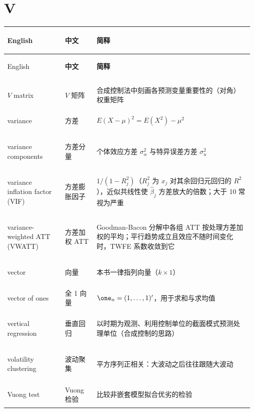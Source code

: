 \section*{V}
\begin{longtable}{@{}>{\bfseries\boldmath\raggedright\arraybackslash}p{4.6cm}>{\raggedright\arraybackslash}p{3.2cm}>{\raggedright\arraybackslash}p{\dimexpr\textwidth-7.8cm-4\tabcolsep\relax}@{}}
\toprule
English & \textbf{中文} & \textbf{简释}\\
\midrule
\endfirsthead
\toprule
English & \textbf{中文} & \textbf{简释}\\
\midrule
\endhead
\midrule
\multicolumn{3}{r@{}}{\footnotesize\itshape （续下页）}\\
\endfoot
\bottomrule
\endlastfoot
$V$ matrix & $V$ 矩阵 & 合成控制法中刻画各预测变量重要性的（对角）权重矩阵 \\
variance & 方差 & $E(X-\mu)^2=E(X^2)-\mu^2$ \\
variance components & 方差分量 & 个体效应方差 $\sigma_\alpha^2$ 与特异误差方差 $\sigma_u^2$ \\
variance inflation factor (VIF) & 方差膨胀因子 & $1/(1-R_j^2)$（$R_j^2$ 为 $x_j$ 对其余回归元回归的 $R^2$），近似共线性使 $\hat\beta_j$ 方差放大的倍数；大于 10 常视为严重 \\
variance-weighted ATT (VWATT) & 方差加权 ATT & Goodman-Bacon 分解中各组 ATT 按处理方差加权的平均；平行趋势成立且效应不随时间变化时，TWFE 系数收敛到它 \\
vector & 向量 & 本书一律指列向量（$k\times1$） \\
vector of ones & 全 1 向量 & $\one_n=(1,\dots,1)'$，用于求和与求均值 \\
vertical regression & 垂直回归 & 以时期为观测、利用控制单位的截面模式预测处理单位（合成控制的思路） \\
volatility clustering & 波动聚集 & 平方序列正相关：大波动之后往往跟随大波动 \\
Vuong test & Vuong 检验 & 比较非嵌套模型拟合优劣的检验 \\
\end{longtable}

\par{}\ifdim\dimexpr\pagegoal-\pagetotal\relax<16\baselineskip\newpage\fi
